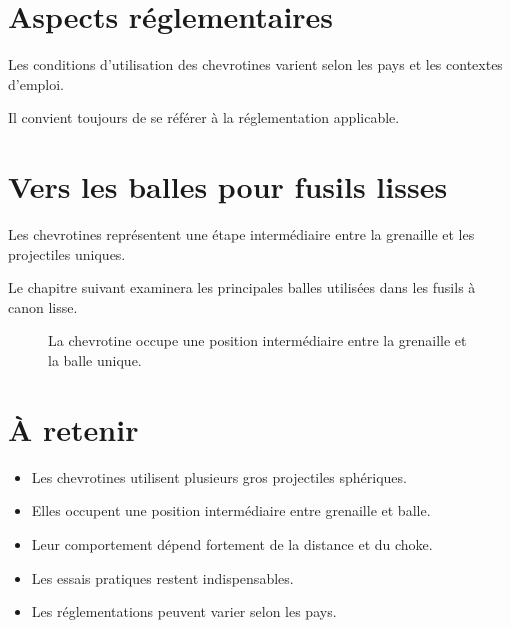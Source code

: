 \section{Aspects réglementaires}

Les conditions d'utilisation des chevrotines varient selon les pays et les
contextes d'emploi.

Il convient toujours de se référer à la réglementation applicable.

\section{Vers les balles pour fusils lisses}

Les chevrotines représentent une étape intermédiaire entre la grenaille et les
projectiles uniques.

Le chapitre suivant examinera les principales balles utilisées dans les fusils
à canon lisse.

\begin{figure}[htbp]
\centering


\caption{La chevrotine occupe une position intermédiaire entre la grenaille et la balle unique.}
\label{fig:position_chevrotine}

\end{figure}

\section{À retenir}

\begin{aretenir}

\begin{itemize}
    \item Les chevrotines utilisent plusieurs gros projectiles sphériques.
    \item Elles occupent une position intermédiaire entre grenaille et balle.
    \item Leur comportement dépend fortement de la distance et du choke.
    \item Les essais pratiques restent indispensables.
    \item Les réglementations peuvent varier selon les pays.
\end{itemize}

\end{aretenir}


